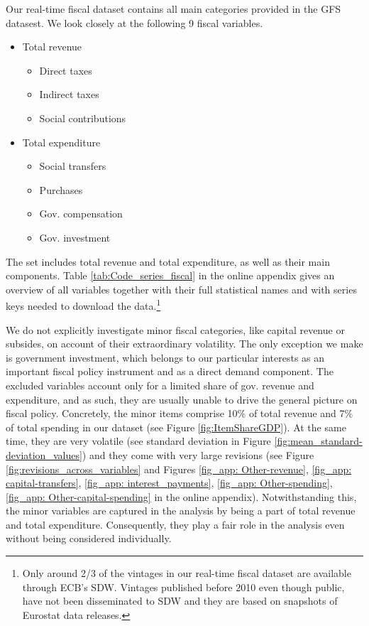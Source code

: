 Our real-time fiscal dataset contains all main categories provided in the GFS datasest. We look closely at the following 9 fiscal variables.
\begin{itemize}
    \item Total revenue
    \begin{itemize}
        \item {{Direct taxes}}
        \item {{Indirect taxes}}
        \item {{Social contributions}}
    \end{itemize}
    \item Total expenditure
    \begin{itemize}
        \item {{Social transfers}}
        \item {{Purchases}}
        \item {{Gov. compensation}}
        \item {{Gov. investment}}
    \end{itemize}
\end{itemize}

The set includes total revenue and total expenditure, as well as their main components. Table \ref{tab:Code_series_fiscal} in the online appendix gives an overview of all variables together with their full statistical names and with series keys needed to download the data.\footnote{Only around 2/3 of the vintages in our real-time fiscal dataset are available through ECB's SDW. Vintages published before 2010 even though public, have not been disseminated to SDW and they are based on snapshots of Eurostat data releases.}

We do not explicitly investigate minor fiscal categories, like capital revenue or subsides, on account of their extraordinary volatility. The only exception we make is government investment, which belongs to our particular interests as an important fiscal policy instrument and as a direct demand component. The excluded variables account only for a limited share of gov. revenue and expenditure, and as such, they are usually unable to drive the general picture on fiscal policy. Concretely, the minor items comprise 10\% of total revenue and 7\% of total spending in our dataset (see Figure \ref{fig:ItemShareGDP}). At the same time, they are very volatile (see standard deviation in Figure \ref{fig:mean_standard-deviation_values}) and they come with very large revisions (see Figure \ref{fig:revisions_across_variables} and Figures \ref{fig_app: Other-revenue}, \ref{fig_app: capital-transfers}, \ref{fig_app: interest_payments}, \ref{fig_app: Other-spending}, \ref{fig_app: Other-capital-spending} in the online appendix). Notwithstanding this, the minor variables are captured in the analysis by being a part of total revenue and total expenditure. Consequently, they play a fair role in the analysis even without being considered individually.

